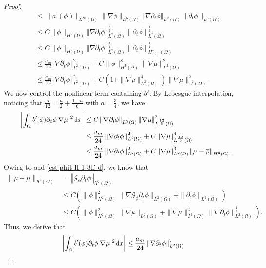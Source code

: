 \documentclass[11pt,reqno]{amsart}
\theoremstyle{remark}
\newcommand \norm[1] {\left\Vert #1\right\Vert}
\def\G{\mathcal{G}}
\def\d{{\rm d}}
\numberwithin{equation}{section}
\def\d{{\rm d}}
\begin{document}
\begin{proof}
\begin{align*}
&\leq
\| a'(\phi)\|_{L^\infty(\Omega)} 
 \| \nabla \phi\|_{L^6(\Omega)}\norm{\nabla \partial_t \phi}_{L^2(\Omega)}
\| \partial_t \phi\|_{L^3(\Omega)}
\\
&\leq
C  \|\phi\|_{H^2(\Omega)} \norm{\nabla \partial_t \phi}_{L^2(\Omega)}^\frac32 
\| \partial_t \phi\|_{L^2(\Omega)}^\frac12
\\
&\leq
C \| \phi\|_{H^2(\Omega)}  \norm{\nabla \partial_t \phi}_{L^2(\Omega)}^\frac{7}{4}
\| \partial_t \phi\|_{H^{-1}_{(0)}(\Omega)}^\frac14
\\
&
\leq
\frac{a_m}{12} \norm{\nabla \partial_t \phi}_{L^2(\Omega)}^2 +
C \| \phi\|_{H^2(\Omega)}^{8}  \| \nabla \mu\|_{L^2(\Omega)}^2
\\
& \leq
\frac{a_m}{12} \norm{\nabla \partial_t \phi}_{L^2(\Omega)}^2 +
C \left( 1+ \| \nabla \mu\|_{L^2(\Omega)}^4\right)
 \| \nabla \mu\|_{L^2(\Omega)}^2.
\end{align*}
We now control the nonlinear term containing $b'$. By Lebesgue interpolation, noticing that $\frac{5}{12}=\frac{a}{2}+\frac{1-a}{6}$ with $a=\frac34$, we have
\begin{align}
\left| \int_{\Omega} b'(\phi )\partial_t \phi |\nabla \mu |^2 \, \d x\right|
& \le C \norm{ \nabla\partial_t \phi }_{L^2(\Omega)}
\norm{\nabla \mu}_{L^\frac{12}{5}(\Omega)}^2
\notag
\\
&\leq \frac{a_m}{24}\norm{ \nabla\partial_t \phi }_{L^2(\Omega)}^2+C\norm{\nabla \mu}_{L^\frac{12}{5}(\Omega)}^4
\notag
\\
&\leq \frac{a_m}{24}\norm{ \nabla\partial_t \phi }_{L^2(\Omega)}^2+C\norm{\nabla \mu}_{L^2(\Omega)}^3\norm{\mu-\overline{\mu}}_{H^2(\Omega)}.
\label{third_method_2}
\end{align}
Owing to \cite[eq. (2.26)]{BB1999} and \eqref{est-phit-H-1-3D-d}, we know that
\begin{align*}
\| \mu - \overline{\mu}\|_{H^2(\Omega)}
&= \norm{\G_{\phi} \partial_t \phi}_{H^2(\Omega)}
\\
&\leq
C \left(
\| \phi\|_{H^2(\Omega)}^2 \| \nabla \mathcal{G}_{\phi} \partial_t \phi\|_{L^2(\Omega)}+ \| \partial_t \phi\|_{L^2(\Omega)} \right)
\\
&\leq C \left(  \| \phi\|_{H^2(\Omega)}^2 \| \nabla \mu\|_{L^2(\Omega)} + \| \nabla \mu\|_{L^2(\Omega)}^\frac12 \| \nabla \partial_t \phi\|_{L^2(\Omega)}^\frac12  \right)\!.
\end{align*}
Thus, we derive that
\begin{align*}
\left| \int_{\Omega} b'(\phi )\partial_t \phi |\nabla \mu |^2 \, \d x\right|
&\leq \frac{a_m}{24}\norm{ \nabla\partial_t \phi }_{L^2(\Omega)}^2

\end{align*}
\end{proof}
\end{document}
